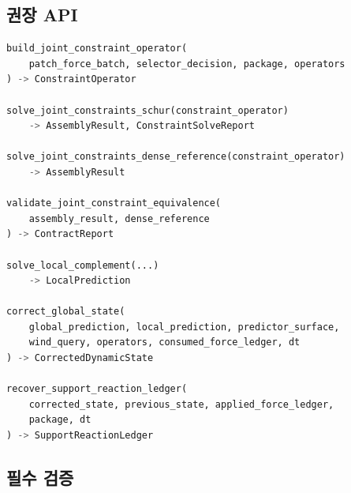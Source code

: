 \documentclass[10pt,a4paper]{article}
\begin{document}
\subsection*{권장 API}

\begin{lstlisting}[language=Python]
build_joint_constraint_operator(
    patch_force_batch, selector_decision, package, operators
) -> ConstraintOperator

solve_joint_constraints_schur(constraint_operator)
    -> AssemblyResult, ConstraintSolveReport

solve_joint_constraints_dense_reference(constraint_operator)
    -> AssemblyResult

validate_joint_constraint_equivalence(
    assembly_result, dense_reference
) -> ContractReport

solve_local_complement(...)
    -> LocalPrediction

correct_global_state(
    global_prediction, local_prediction, predictor_surface,
    wind_query, operators, consumed_force_ledger, dt
) -> CorrectedDynamicState

recover_support_reaction_ledger(
    corrected_state, previous_state, applied_force_ledger,
    package, dt
) -> SupportReactionLedger
\end{lstlisting}

\subsection*{필수 검증}
\end{document}
